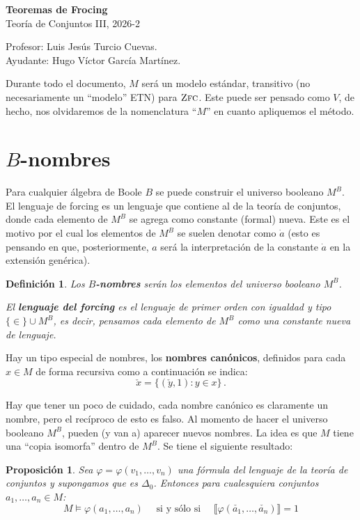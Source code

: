 \documentclass[letterpaper,DIV=15,12pt]{scrartcl}
\newtheorem{proposicion}{Proposición}
\newtheorem{definicion}{Definición}
\newcommand{\tq}{:}
\newcommand{\sii}{\quad \text{ si y sólo si } \quad}
\newcommand{\Bv}[1]{\llbracket #1 \rrbracket}
\newcommand{\zfc}{\operatorname*{\textsc{Zfc}}}
\begin{document}
\thispagestyle{plain}

    \begin{center}
        {\fontsize{30}{60}\rmfamily \textbf{Teoremas de Frocing}} \\ \vspace{.2cm} Teoría de Conjuntos III, 2026-2
    \end{center}
    \begin{flushright}
        \footnotesize \hfill Profesor: Luis Jesús Turcio Cuevas.\\
        \hfill Ayudante: Hugo Víctor García Martínez.
    \end{flushright}
    
    Durante todo el documento, $M$ será un modelo estándar, transitivo (no necesariamente un ``modelo'' ETN) para $\zfc$. Este puede ser pensado como $V$, de hecho, nos olvidaremos de la nomenclatura ``$M$'' en cuanto apliquemos el método.

    \section*{$B$-nombres}

    Para cualquier álgebra de Boole $B$ se puede construir el universo booleano $M^B$. El lenguaje de forcing es un lenguaje que contiene al de la teoría de conjuntos, donde cada elemento de $M^B$ se agrega como constante (formal) nueva. Este es el motivo por el cual los elementos de $M^B$ se suelen denotar como $\dot{a}$ (esto es pensando en que, posteriormente, $a$ será la interpretación de la constante $\dot{a}$ en la extensión genérica).

    \begin{definicion}
        Los \textbf{$B$-nombres} serán los elementos del universo booleano $M^B$.

        El \textbf{lenguaje del forcing} es el lenguaje de primer orden con igualdad y tipo $\{ \in \} \cup M^{B}$, es decir, pensamos cada elemento de $M^B$ como una constante nueva de lenguaje.
    \end{definicion}

    Hay un tipo especial de nombres, los \textbf{nombres canónicos}, definidos para cada $x \in M$ de forma recursiva como a continuación se indica:
    \begin{equation}
        \check{x} = \{ (\check{y},1) \tq y \in x \} \, .
    \end{equation}

    Hay que tener un poco de cuidado, cada nombre canónico es claramente un nombre, pero el recíproco de esto es falso. Al momento de hacer el universo booleano $M^B$, pueden (y van a) aparecer nuevos nombres. La idea es que $M$ tiene una ``copia isomorfa'' dentro de $M^B$. Se tiene el siguiente resultado:
    \begin{proposicion}
        Sea $\varphi=\varphi(v_1, \dots, v_n)$ una fórmula del lenguaje de la teoría de conjuntos y supongamos que es $\Delta_0$. Entonces para cualesquiera conjuntos $a_1, \dots, a_n \in M$:
        \[ M \vDash \varphi(a_1, \dots, a_n) \sii \Bv{\varphi(\check{a_1}, \dots, \check{a_n})} = 1 \]
    \end{proposicion}
\end{document}
